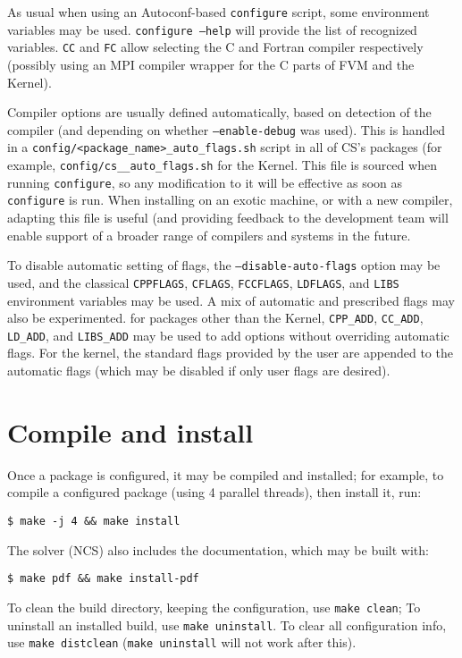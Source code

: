 \documentclass[a4paper,10pt,twoside]{article}
\begin{document}
As usual when using an Autoconf-based \texttt{configure} script,
some environment variables may be used. \texttt{configure --help}
will provide the list of recognized variables.
\texttt{CC} and \texttt{FC} allow selecting the C and Fortran compiler
respectively (possibly using an MPI compiler wrapper for the C parts
of FVM and the Kernel).

Compiler options are usually defined automatically, based on
detection of the compiler (and depending on whether \texttt{--enable-debug}
was used). This is handled in a \texttt{config/<package\_name>\_auto\_flags.sh}
script in all of CS's packages (for example,
\texttt{config/cs\_\_auto\_flags.sh}
for the Kernel. This file is sourced when running \texttt{configure}, so
any modification to it will be effective as soon as \texttt{configure} is run.
When installing on an exotic machine, or with a new compiler, adapting this
file is useful (and providing feedback to the \CS development team
will enable support of a broader range of compilers and systems in the
future.

To disable automatic setting of flags, the \texttt{--disable-auto-flags}
option may be used, and the classical \texttt{CPPFLAGS}, \texttt{CFLAGS},
\texttt{FCCFLAGS}, \texttt{LDFLAGS}, and \texttt{LIBS} environment variables
may be used. A mix of automatic and prescribed flags may also be experimented.
for packages other than the Kernel, \texttt{CPP\_ADD}, \texttt{CC\_ADD},
\texttt{LD\_ADD}, and \texttt{LIBS\_ADD} may be used to add options without
overriding automatic flags. For the kernel, the standard flags provided by
the user are appended to the automatic flags (which may be disabled
if only user flags are desired).

\section{Compile and install\label{sec:compile}}

Once a package is configured, it may be compiled and installed;
for example, to compile a configured package (using 4 parallel threads),
then install it, run:

\texttt{\$ make -j 4 \&\& make install}

The solver (NCS) also includes the documentation, which may be built
with:

\texttt{\$ make pdf \&\& make install-pdf}

To clean the build directory, keeping the configuration,
use \texttt{make clean};
To uninstall an installed build, use \texttt{make uninstall}.
To clear all configuration info, use \texttt{make distclean}
(\texttt{make uninstall} will not work after this).
\end{document}
